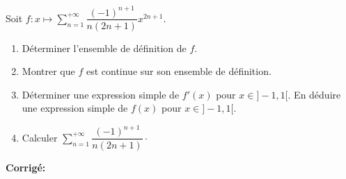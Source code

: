 \documentclass[a4paper,twoside,french,11pt]{VcCours}
\newcommand{\corr}{\textbf{Corrigé:}}
\begin{document}
  
  \begin{Exercice}{} Soit $f : x \mapsto \sum_{n=1}^{+ \infty} \dfrac{(-1)^{n+1}}{n(2n+1)} x^{2n+1}$.

\begin{enumerate}
\item Déterminer l'ensemble de définition de $f$.
\item Montrer que $f$ est continue sur son ensemble de définition.
\item Déterminer une expression simple de $f'(x)$ pour $x \in ]-1,1[$. En déduire une expression simple de $f(x)$ pour $x \in ]-1,1[$.
\item Calculer $ \sum_{n=1}^{+ \infty} \dfrac{(-1)^{n+1}}{n(2n+1)} \cdot$
\end{enumerate}
\end{Exercice}


\corr 
\end{document}
